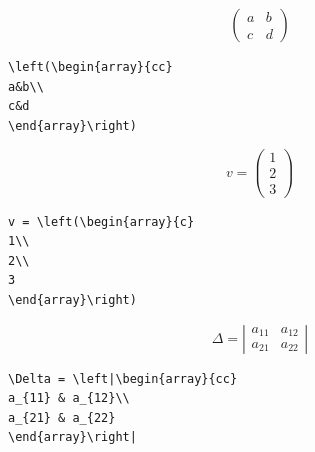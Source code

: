 \vspace{.3cm}
{\small
\begin{minipage}[t]{5cm}
$$\left(\begin{array}{cc}
a&b\\
c&d
\end{array}\right)$$
\end{minipage}
\hspace{2cm}
\begin{minipage}[t]{5cm}
\begin{verbatim}
\left(\begin{array}{cc}
a&b\\
c&d
\end{array}\right)
\end{verbatim}
\end{minipage}

\vspace{.3cm}
\begin{minipage}[t]{5cm}
$$ v = \left(\begin{array}{c}
1\\
2\\
3
\end{array}\right)$$
\end{minipage}
\hspace{2cm}
\begin{minipage}[t]{5cm}
\begin{verbatim}
v = \left(\begin{array}{c}
1\\
2\\
3
\end{array}\right)
\end{verbatim}
\end{minipage}

\vspace{.3cm}
\begin{minipage}[t]{5cm}
$$ 
\Delta = \left|\begin{array}{cc}
a_{11} & a_{12}\\
a_{21} & a_{22}
\end{array}\right|
$$
\end{minipage}
\hspace{2cm}
\begin{minipage}[t]{5cm}
\begin{verbatim}
\Delta = \left|\begin{array}{cc}
a_{11} & a_{12}\\
a_{21} & a_{22}
\end{array}\right|
\end{verbatim}
\end{minipage}
}
\vspace{.3cm}

